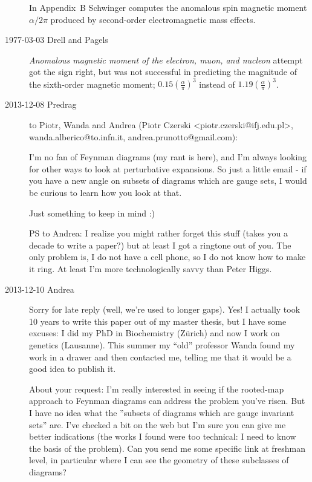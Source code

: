\begin{description}
In Appendix~B Schwinger computes the anomalous spin magnetic
moment $\alpha/2\pi$ produced by second-order electromagnetic mass effects.

\item[1977-03-03 Drell and Pagels]
{\em Anomalous magnetic moment of the electron, muon, and nucleon}
attempt got the sign right, but was not successful in predicting the
magnitude of the sixth-order magnetic moment;
$0.15 \left(\frac{\alpha}{\pi}\right)^3$ instead of
$1.19 \left(\frac{\alpha}{\pi}\right)^3$.

\item[2013-12-08  Predrag] to Piotr, Wanda and Andrea
(Piotr Czerski <piotr.czerski@ifj.edu.pl>,
 wanda.alberico@to.infn.it,
 andrea.prunotto@gmail.com):

I'm no fan of Feynman diagrams (my rant is
{here}), and I'm always looking for other ways to look at perturbative
expansions. So just a little email - if you have a new angle on
subsets of diagrams which are gauge sets, I would be curious to learn how you
look at that.

Just something to keep in mind :)

PS to Andrea: I realize you might rather forget this stuff (takes you a
decade to write a paper?) but at least I got a ringtone out of you. The
only problem is, I do not have a cell phone, so I do not know how to make
it ring. At least I'm more technologically savvy than
{Peter Higgs}.

\item[2013-12-10  \HREF{https://sites.google.com/site/andreaprunotto/} {Andrea}]
Sorry for late reply (well, we're used to longer gaps). Yes! I actually
took 10 years to write this paper out of my master thesis, but I have
some excuses: I did my PhD in Biochemistry (Z\"urich) and now I work on
genetics (Lausanne). This summer my ``old'' professor Wanda found my work
in a drawer and then contacted me, telling me that it would be a good
idea to publish it.

About your request: I'm really interested in seeing if the rooted-map
approach to Feynman diagrams can address the problem you've risen. But I
have no idea what the ''subsets of diagrams which are gauge invariant
sets'' are. I've checked a bit on the web but I'm sure you can give me
better indications (the works I found were too technical: I need to know
the basis of the problem). Can you send me some specific link at freshman
level, in particular where I can see the geometry of these subclasses of
diagrams?


\end{description}
